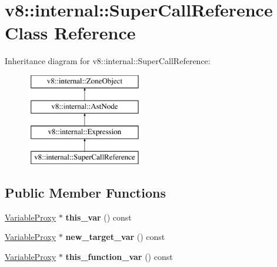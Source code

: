 \hypertarget{classv8_1_1internal_1_1SuperCallReference}{}\section{v8\+:\+:internal\+:\+:Super\+Call\+Reference Class Reference}
\label{classv8_1_1internal_1_1SuperCallReference}
Inheritance diagram for v8\+:\+:internal\+:\+:Super\+Call\+Reference\+:\begin{figure}[H]
\begin{center}
\leavevmode
\includegraphics[height=4.000000cm]{classv8_1_1internal_1_1SuperCallReference}
\end{center}
\end{figure}
\subsection*{Public Member Functions}
\begin{DoxyCompactItemize}
\item 
\mbox{\label{classv8_1_1internal_1_1SuperCallReference_aa693073e5522e7bb1e58a47a63f58918}} 
\mbox{\hyperlink{classv8_1_1internal_1_1VariableProxy}{Variable\+Proxy}} $\ast$ {\bfseries this\+\_\+var} () const
\item 
\mbox{\label{classv8_1_1internal_1_1SuperCallReference_af88c150b010c870b33446e54924922c5}} 
\mbox{\hyperlink{classv8_1_1internal_1_1VariableProxy}{Variable\+Proxy}} $\ast$ {\bfseries new\+\_\+target\+\_\+var} () const
\item 
\mbox{\label{classv8_1_1internal_1_1SuperCallReference_a11c0f749e5f5b24ecf2f4d8e2c5c61e9}} 
\mbox{\hyperlink{classv8_1_1internal_1_1VariableProxy}{Variable\+Proxy}} $\ast$ {\bfseries this\+\_\+function\+\_\+var} () const
\end{DoxyCompactItemize}
